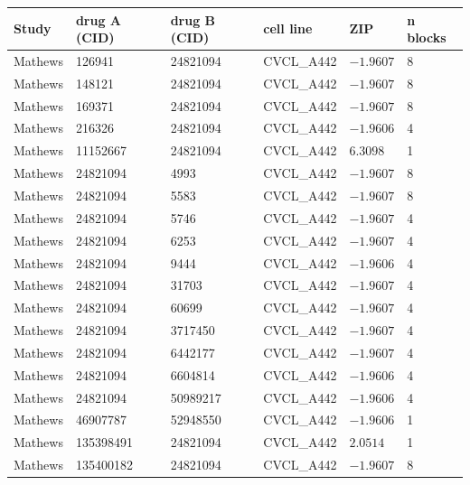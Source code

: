 \documentclass[11pt,letterpaper]{article}
\begin{document}
\begin{center}
\small
\begin{tabular}{|p{1.6cm}|p{2.2cm}|p{2.2cm}|p{2.4cm}|p{2.2cm}|p{1.6cm}|}
\hline
\textbf{Study} & \textbf{drug A (CID)} & \textbf{drug B (CID)} & \textbf{cell line} & \textbf{ZIP} & \textbf{n blocks} \\
\hline
Mathews & 126941 & 24821094 & CVCL\_A442 & $-1.9607$ & 8 \\
\hline
Mathews & 148121 & 24821094 & CVCL\_A442 & $-1.9607$ & 8 \\
\hline
Mathews & 169371 & 24821094 & CVCL\_A442 & $-1.9607$ & 8 \\
\hline
Mathews & 216326 & 24821094 & CVCL\_A442 & $-1.9606$ & 4 \\
\hline
Mathews & 11152667 & 24821094 & CVCL\_A442 & $6.3098$ & 1 \\
\hline
Mathews & 24821094 & 4993 & CVCL\_A442 & $-1.9607$ & 8 \\
\hline
Mathews & 24821094 & 5583 & CVCL\_A442 & $-1.9607$ & 8 \\
\hline
Mathews & 24821094 & 5746 & CVCL\_A442 & $-1.9607$ & 4 \\
\hline
Mathews & 24821094 & 6253 & CVCL\_A442 & $-1.9607$ & 4 \\
\hline
Mathews & 24821094 & 9444 & CVCL\_A442 & $-1.9606$ & 4 \\
\hline
Mathews & 24821094 & 31703 & CVCL\_A442 & $-1.9607$ & 4 \\
\hline
Mathews & 24821094 & 60699 & CVCL\_A442 & $-1.9607$ & 4 \\
\hline
Mathews & 24821094 & 3717450 & CVCL\_A442 & $-1.9607$ & 4 \\
\hline
Mathews & 24821094 & 6442177 & CVCL\_A442 & $-1.9607$ & 4 \\
\hline
Mathews & 24821094 & 6604814 & CVCL\_A442 & $-1.9606$ & 4 \\
\hline
Mathews & 24821094 & 50989217 & CVCL\_A442 & $-1.9606$ & 4 \\
\hline
Mathews & 46907787 & 52948550 & CVCL\_A442 & $-1.9606$ & 1 \\
\hline
Mathews & 135398491 & 24821094 & CVCL\_A442 & $2.0514$ & 1 \\
\hline
Mathews & 135400182 & 24821094 & CVCL\_A442 & $-1.9607$ & 8 \\
\hline
\end{tabular}
\end{center}
\end{document}

